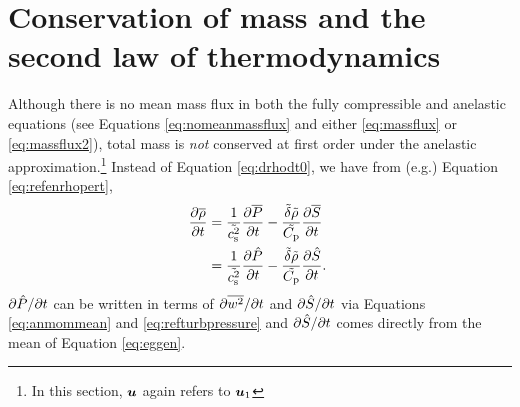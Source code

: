 \documentclass[12pt]{article}
\begin{document}
\section{Conservation of mass and the second law of thermodynamics}\label{sec:secondlaw}
Although there is no mean mass flux in both the fully compressible and anelastic equations (see Equations \eqref{eq:nomeanmassflux} and either \eqref{eq:massflux} or \eqref{eq:massflux2}), total mass is \textit{not} conserved at first order under the anelastic approximation.\footnote{In this section, $\bm{u}$ again refers to ${\bm{u}}_1$} Instead of Equation \eqref{eq:drhodt0}, we have from (e.g.) Equation \eqref{eq:refenrhopert}, 
\begin{align}\label{eq:drhodtnot0}
 \frac{\partial\overline{\rho}}{\partial t} &= \frac{1}{\tilde{c_{\rm s}^2}}\frac{\partial\overline{P}}{\partial t}-\frac{\tilde{\delta} \tilde{\rho}}{\tilde{C_{\rm{p}}}}\frac{\partial\overline{S}}{\partial t}\nonumber\\
 &=  \frac{1}{\tilde{c_{\rm s}^2}}\frac{\partial\hat{P}}{\partial t}-\frac{\tilde{\delta} \tilde{\rho}}{\tilde{C_{\rm{p}}}}\frac{\partial\hat{S}}{\partial t}.\
\end{align}
$\partial\hat{P}/\partial t$ can be written in terms of $\partial\overline{w^2}/\partial t$ and $\partial\hat{S}/\partial t$ via Equations \eqref{eq:anmommean} and \eqref{eq:refturbpressure} and $\partial\hat{S}/\partial t$ comes directly from the mean of Equation \eqref{eq:eggen}. 

\end{document}
